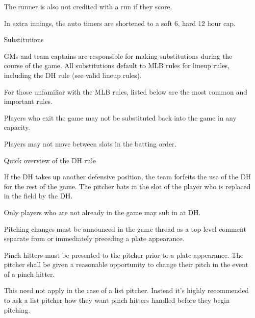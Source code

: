 \begin{deepEnumerate}
\begin{deepEnumerate}
\begin{deepEnumerate}
			The runner is also not credited with a run if they score.
			\item In extra innings, the auto timers are shortened to a soft 6, hard 12 hour cap.
		\end{deepEnumerate}
	\end{deepEnumerate}
	\item Substitutions
	\begin{deepEnumerate}
		\item GMs and team captains are responsible for making substitutions during the course of the game.
		All substitutions default to MLB rules for lineup rules, including the DH rule (see valid lineup rules).
		\begin{deepEnumerate}
			\item For those unfamiliar with the MLB rules, listed below are the most common and important rules.
			\begin{deepEnumerate}
				\item Players who exit the game may not be substituted back into the game in any capacity.
				\item Players may not move between slots in the batting order.
				\item Quick overview of the DH rule
				\begin{deepEnumerate}
					\item If the DH takes up another defensive position, the team forfeits the use of the DH for the rest of the game. 
					The pitcher bats in the slot of the player who is replaced in the field by the DH.
					\item Only players who are not already in the game may sub in at DH.
				\end{deepEnumerate}
			\end{deepEnumerate}
		\end{deepEnumerate}
		\item Pitching changes must be announced in the game thread as a top-level comment separate from or immediately preceding a plate appearance.
		\item Pinch hitters must be presented to the pitcher prior to a plate appearance. 
		The pitcher shall be given a reasonable opportunity to change their pitch in the event of a pinch hitter.
		\begin{deepEnumerate}
			\item This need not apply in the case of a list pitcher. 
			Instead it’s highly recommended to ask a list pitcher how they want pinch hitters handled before they begin pitching.

\end{deepEnumerate}
\end{deepEnumerate}
\end{deepEnumerate}
